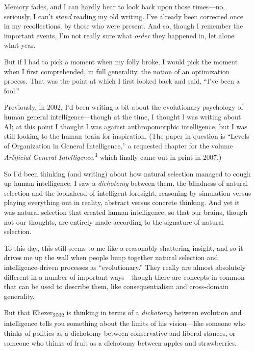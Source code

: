 {
 Memory fades, and I can hardly bear to look back upon those
times---no, seriously, I can't \textit{stand} reading
my old writing. I've already been corrected once in my
recollections, by those who were present. And so, though I remember the
important events, I'm not really sure what
\textit{order} they happened in, let alone what year.}

{
 But if I had to pick a moment when my folly broke, I would pick
the moment when I first comprehended, in full generality, the notion of
an optimization process. That was the point at which I first looked
back and said, ``I've been a
fool.''}

{
 Previously, in 2002, I'd been writing a bit about
the evolutionary psychology of human general intelligence---though at
the time, I thought I was writing about AI; at this point I thought I
was against anthropomorphic intelligence, but I was still looking to
the human brain for inspiration. (The paper in question is
``Levels of Organization in General
Intelligence,'' a requested chapter for the volume
\textit{Artificial General Intelligence},\textsuperscript{1} which
finally came out in print in 2007.)}

{
 So I'd been thinking (and writing) about how
natural selection managed to cough up human intelligence; I saw a
\textit{dichotomy} between them, the blindness of natural selection and
the lookahead of intelligent foresight, reasoning by simulation versus
playing everything out in reality, abstract versus concrete thinking.
And yet it was natural selection that created human intelligence, so
that our brains, though not our thoughts, are entirely made according
to the signature of natural selection.}

{
 To this day, this still seems to me like a reasonably shattering
insight, and so it drives me up the wall when people lump together
natural selection and intelligence-driven processes as
``evolutionary.'' They really are
almost absolutely different in a number of important ways---though
there are concepts in common that can be used to describe them, like
consequentialism and cross-domain generality.}

{
 But that Eliezer\textsubscript{2002} is thinking in terms of a
\textit{dichotomy} between evolution and intelligence tells you
something about the limits of his vision---like someone who thinks of
politics as a dichotomy between conservative and liberal stances, or
someone who thinks of fruit as a dichotomy between apples and
strawberries.}

